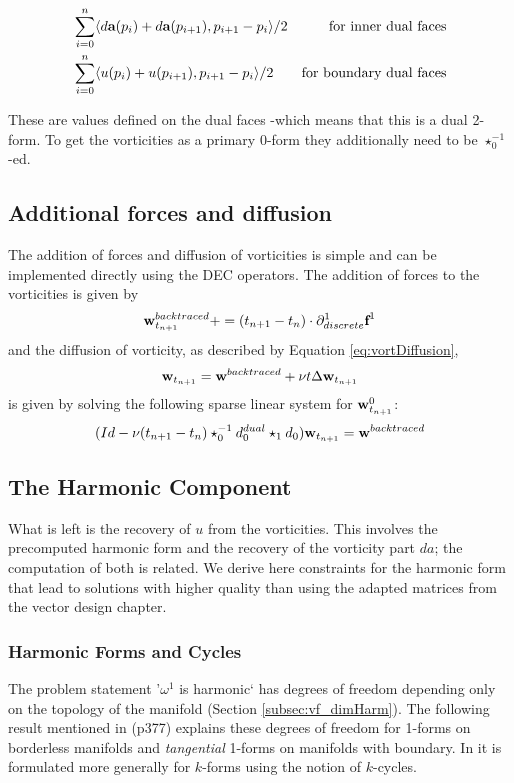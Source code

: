 \begin{align*}
&\sum_{i=0}^n\langle d\textbf{a}(p_i) + d\textbf{a}(p_{i+1}), p_{i+1}-p_{i}\rangle/2 & \text{for inner dual faces}\\
&\sum_{i=0}^n\langle u(p_i) + u(p_{i+1}), p_{i+1}-p_{i}\rangle/2& \text{for boundary dual faces}
\end{align*}

These are values defined on the dual faces -which means that this is a dual 2-form. To get the vorticities as a primary $0$-form they additionally need to be $\star_0^{-1}$-ed.

\subsection{Additional forces and diffusion}
\label{ssec:fd_diffusion_and_forces}
The addition of forces and diffusion of vorticities is simple and can be implemented directly using the DEC operators. The addition of forces to the vorticities is given by
$$\textbf{w}^{backtraced}_{t_{n+1}} += (t_{n+1}-t_n)\cdot\partial^1_{discrete} \textbf{f}^1$$
and the diffusion of vorticity, as described by Equation \ref{eq:vortDiffusion},
\[\textbf{w}_{t_{n+1}} = \textbf{w}^{backtraced} + \nu t \Delta \textbf{w}_{t_{n+1}}\]
is given by solving the following sparse linear system for $\textbf{w}^0_{t_{n+1}}$:
$$(Id - \nu (t_{n+1}-t_n)  \star_0^{-1} d^{dual}_0\star_1d_0)\textbf{w}_{t_{n+1}} = \textbf{w}^{backtraced}$$


\subsection{The Harmonic Component}
\label{ssec:fd_harmonic}
What is left is the recovery of $u$ from the vorticities. This involves the precomputed harmonic form and the recovery of the vorticity part $da$; the computation of both is related. We derive here constraints for the harmonic form that lead to solutions with higher quality than using the adapted matrices from the vector design chapter. 

\subsubsection{Harmonic Forms and Cycles}
The problem statement '$\omega^1$ is harmonic` has degrees of freedom depending only on the topology of the manifold (Section \ref{subsec:vf_dimHarm}). The following result mentioned in \cite{FRANKEL11} (p377) explains these degrees of freedom for 1-forms on borderless manifolds and \emph{tangential} 1-forms on manifolds with boundary. In \cite{FRANKEL11} it is formulated more generally for $k$-forms using the notion of $k$-cycles.


